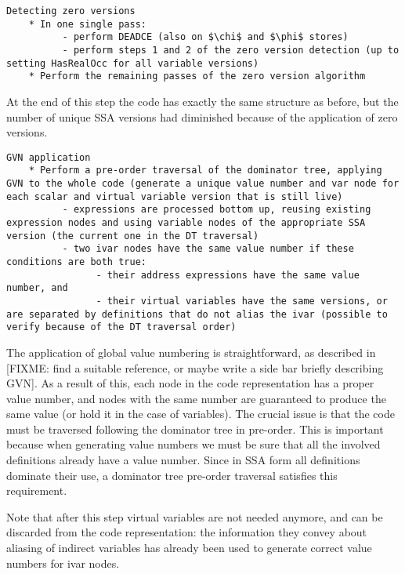 \begin{verbatim}
Detecting zero versions
    * In one single pass:
          - perform DEADCE (also on $\chi$ and $\phi$ stores)
          - perform steps 1 and 2 of the zero version detection (up to setting HasRealOcc for all variable versions)
    * Perform the remaining passes of the zero version algorithm
\end{verbatim}

At the end of this step the code has exactly the same structure as before, but the number of unique SSA versions had diminished because of the application of zero versions.

\begin{verbatim}
GVN application
    * Perform a pre-order traversal of the dominator tree, applying GVN to the whole code (generate a unique value number and var node for each scalar and virtual variable version that is still live)
          - expressions are processed bottom up, reusing existing expression nodes and using variable nodes of the appropriate SSA version (the current one in the DT traversal)
          - two ivar nodes have the same value number if these conditions are both true:
                - their address expressions have the same value number, and
                - their virtual variables have the same versions, or are separated by definitions that do not alias the ivar (possible to verify because of the DT traversal order)
\end{verbatim}

The application of global value numbering is straightforward, as described in [FIXME: find a suitable reference, or maybe write a side bar briefly describing GVN].
As a result of this, each node in the code representation has a proper value number, and nodes with the same number are guaranteed to produce the same value (or hold it in the case of variables).
The crucial issue is that the code must be traversed following the dominator tree in pre-order. This is important because when generating value numbers we must be sure that all the involved definitions already have a value number. Since in SSA form all definitions dominate their use, a dominator tree pre-order traversal satisfies this requirement.

Note that after this step virtual variables are not needed anymore, and can be discarded from the code representation: the information they convey about aliasing of indirect variables has already been used to generate correct value numbers for ivar nodes.

